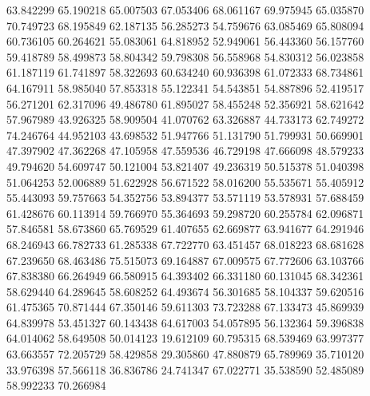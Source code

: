 63.842299
65.190218
65.007503
67.053406
68.061167
69.975945
65.035870
70.749723
68.195849
62.187135
56.285273
54.759676
63.085469
65.808094
60.736105
60.264621
55.083061
64.818952
52.949061
56.443360
56.157760
59.418789
58.499873
58.804342
59.798308
56.558968
54.830312
56.023858
61.187119
61.741897
58.322693
60.634240
60.936398
61.072333
68.734861
64.167911
58.985040
57.853318
55.122341
54.543851
54.887896
52.419517
56.271201
62.317096
49.486780
61.895027
58.455248
52.356921
58.621642
57.967989
43.926325
58.909504
41.070762
63.326887
44.733173
62.749272
74.246764
44.952103
43.698532
51.947766
51.131790
51.799931
50.669901
47.397902
47.362268
47.105958
47.559536
46.729198
47.666098
48.579233
49.794620
54.609747
50.121004
53.821407
49.236319
50.515378
51.040398
51.064253
52.006889
51.622928
56.671522
58.016200
55.535671
55.405912
55.443093
59.757663
54.352756
53.894377
53.571119
53.578931
57.688459
61.428676
60.113914
59.766970
55.364693
59.298720
60.255784
62.096871
57.846581
58.673860
65.769529
61.407655
62.669877
63.941677
64.291946
68.246943
66.782733
61.285338
67.722770
63.451457
68.018223
68.681628
67.239650
68.463486
75.515073
69.164887
67.009575
67.772606
63.103766
67.838380
66.264949
66.580915
64.393402
66.331180
60.131045
68.342361
58.629440
64.289645
58.608252
64.493674
56.301685
58.104337
59.620516
61.475365
70.871444
67.350146
59.611303
73.723288
67.133473
45.869939
64.839978
53.451327
60.143438
64.617003
54.057895
56.132364
59.396838
64.014062
58.649508
50.014123
19.612109
60.795315
68.539469
63.997377
63.663557
72.205729
58.429858
29.305860
47.880879
65.789969
35.710120
33.976398
57.566118
36.836786
24.741347
67.022771
35.538590
52.485089
58.992233
70.266984
